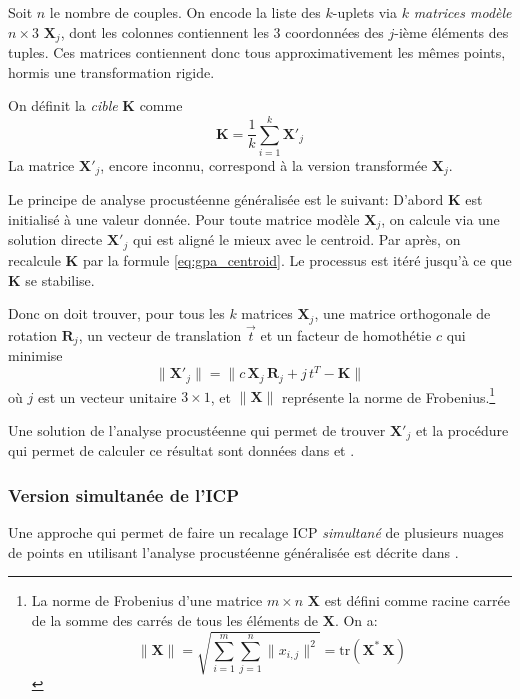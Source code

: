 \documentclass[a4paper,10pt]{scrreprt}
\begin{document}
Soit $n$ le nombre de couples. On encode la liste des $k$-uplets via $k$ \emph{matrices modèle} $n \times 3$ $\mathbf{X}_j$, dont les colonnes contiennent les $3$ coordonnées des $j$-ième éléments des tuples. Ces matrices contiennent donc tous approximativement les mêmes points, hormis une transformation rigide.

On définit la \emph{cible} $\mathbf{K}$ comme
\begin{equation} \label{eq:gpa_centroid}
	\mathbf{K} = \frac{1}{k} \sum_{i=1}^{k} \mathbf{X'}_j 
\end{equation}
La matrice $\mathbf{X'}_j$, encore inconnu, correspond à la version transformée $\mathbf{X}_j$.

Le principe de analyse procustéenne généralisée est le suivant: D'abord $\mathbf{K}$ est initialisé à une valeur donnée. Pour toute matrice modèle $\mathbf{X}_j$, on calcule via une solution directe $\mathbf{X'}_j$ qui est aligné le mieux avec le centroid. Par après, on recalcule $\mathbf{K}$ par la formule \ref{eq:gpa_centroid}. Le processus est itéré jusqu'à ce que $\mathbf{K}$ se stabilise. \cite{Told2010}

Donc on doit trouver, pour tous les $k$ matrices $\mathbf{X}_j$, une matrice orthogonale de rotation $\mathbf{R}_j$, un vecteur de translation $\vec{t}$ et un facteur de homothétie $c$ qui minimise
\begin{equation}
	\| \mathbf{X'}_j \| = \| c \, \mathbf{X}_j \, \mathbf{R}_j + j \, t^T - \mathbf{K} \|
\end{equation}
où $j$ est un vecteur unitaire $3 \times 1$, et $\|\mathbf{X}\|$ représente la norme de Frobenius.\footnote{La norme de Frobenius d'une matrice $m \times n$ $\mathbf{X}$ est défini comme racine carrée de la somme des carrés de tous les éléments de $\mathbf{X}$. On a:\begin{equation}
	\| \mathbf{X} \|
	= \sqrt{ \sum_{i=1}^{m} \sum_{j=1}^{n} \| x_{i,j} \|^2 }
	= \text{tr}(\mathbf{X}^* \, \mathbf{X})
\end{equation}}

Une solution de l'analyse procustéenne qui permet de trouver $\mathbf{X'}_j$ et la procédure qui permet de calculer ce résultat sont données dans \cite{Scho1970} et \cite{Scho1966}. 


\subsubsection{Version simultanée de l'ICP}
Une approche qui permet de faire un recalage ICP \emph{simultané} de plusieurs nuages de points en utilisant l'analyse procustéenne généralisée est décrite dans \cite{Told2010}.
\end{document}
